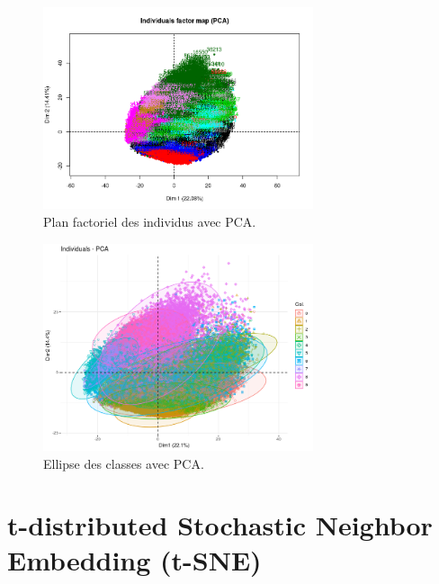 \documentclass{article}
\begin{document}
\begin{figure}[H] 
\centering
\includegraphics[width=300]{pca_ind_factor_map.png}
\caption{Plan factoriel des individus avec PCA.}
\label{fig:pca_ind}
\end{figure}

\begin{figure}[H] 
\centering
\includegraphics[width=300]{pca_ellipse.png}
\caption{Ellipse des classes avec PCA.}
\label{fig:pca_ind}
\end{figure}

\section{t-distributed Stochastic Neighbor Embedding (t-SNE)}
\end{document}
